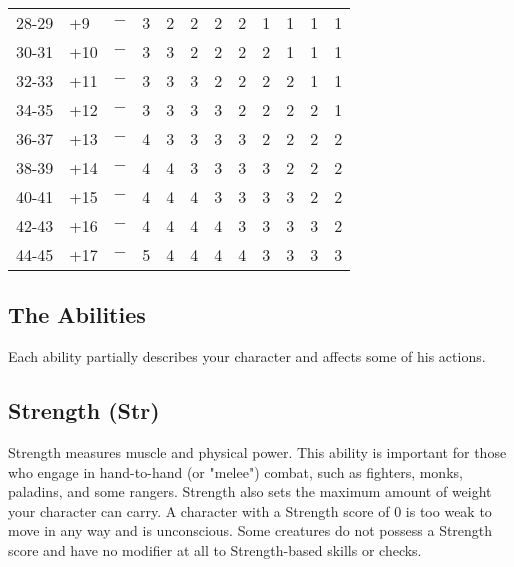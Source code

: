 \begin{table*}[]
\begin{tabular}{llllllllllll}
28-29         & +9       & $-$                                      & 3   & 2   & 2   & 2   & 2   & 1   & 1   & 1   & 1   \\
30-31         & +10      & $-$                                      & 3   & 3   & 2   & 2   & 2   & 2   & 1   & 1   & 1   \\
32-33         & +11      & $-$                                      & 3   & 3   & 3   & 2   & 2   & 2   & 2   & 1   & 1   \\
34-35         & +12      & $-$                                      & 3   & 3   & 3   & 3   & 2   & 2   & 2   & 2   & 1   \\
36-37         & +13      & $-$                                      & 4   & 3   & 3   & 3   & 3   & 2   & 2   & 2   & 2   \\
38-39         & +14      & $-$                                      & 4   & 4   & 3   & 3   & 3   & 3   & 2   & 2   & 2   \\
40-41         & +15      & $-$                                      & 4   & 4   & 4   & 3   & 3   & 3   & 3   & 2   & 2   \\
42-43         & +16      & $-$                                      & 4   & 4   & 4   & 4   & 3   & 3   & 3   & 3   & 2   \\
44-45         & +17      & $-$                                      & 5   & 4   & 4   & 4   & 4   & 3   & 3   & 3   & 3  
\end{tabular}
\end{table*}

				
\subsection{The Abilities}

				
Each ability partially describes your character and affects some of his actions.
				
\subsection{Strength (Str)}

				
Strength measures muscle and physical power. This ability is important for those who engage in hand-to-hand (or "melee") combat, such as fighters, monks, paladins, and some rangers. Strength also sets the maximum amount of weight your character can carry. A character with a Strength score of 0 is too weak to move in any way and is unconscious. Some creatures do not possess a Strength score and have no modifier at all to Strength-based skills or checks.
				
